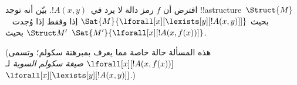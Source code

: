 \documentclass[../../../include/open-logic-section]{subfiles}
\begin{document}
\begin{prob}
افترض أن $f$ رمز دالة لا يرد في~$!A(x,y)$. بيّن أنه توجد
!!a{structure}~$\Struct{M}$ بحيث
$\Sat{M}{\lforall[x][\lexists[y][!A(x,y)]]}$ إذا وفقط إذا وُجدت
~$\Struct M'$ بحيث $\Sat{M'}{\lforall[x][!A(x,f(x))]}$.

(هذه المسألة حالة خاصة مما يعرف بمبرهنة سكولم؛ وتسمى
$\lforall[x][!A(x,f(x))]$ \emph{صيغة سكولم السوية}
لـ~$\lforall[x][\lexists[y][!A(x,y)]]$.)
\end{prob}
\end{document}
